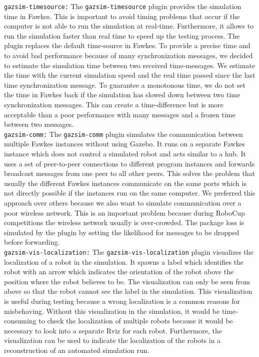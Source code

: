 \texttt{gazsim-timesource:}
The \texttt{gazsim-timesource} plugin provides the simulation time in Fawkes. This is important to avoid timing problems that occur if the computer is not able to run the simulation at real-time. Furthermore, it allows to run the simulation faster than real time to speed up the testing process. The plugin replaces the default time-source in Fawkes. To provide a precise time and to avoid bad performance because of many synchronization messages, we decided to estimate the simulation time between two received time-messages. We estimate the time with the current simulation speed and the real time passed since the last time synchronization message. To guarantee a monotonous time, we do not set the time in Fawkes back if the simulation has slowed down between two time synchronization messages. This can create a time-difference but is more acceptable than a poor performance with many messages and a frozen time between two messages.
\\

\texttt{gazsim-comm:}
The \texttt{gazsim-comm} plugin simulates the communication between multiple Fawkes instances without using Gazebo. It runs on a separate Fawkes instance which does not control a simulated robot and acts similar to a hub. It uses a set of peer-to-peer connections to different program instances and forwards broadcast messages from one peer to all other peers. This solves the problem that usually the different Fawkes instances communicate on the same ports which is not directly possible if the instances run on the same computer. We preferred this approach over others because we also want to simulate communication over a poor wireless network. This is an important problem because during RoboCup competitions the wireless network usually is over-crowded. The package loss is simulated by the plugin by setting the likelihood for messages to be dropped before forwarding.
\\

\texttt{gazsim-vis-localization:}
The \texttt{gazsim-vis-localization} plugin visualizes the localization of a robot in the simulation. It spawns a label which identifies the robot with an arrow which indicates the orientation of the robot above the position where the robot believes to be. The visualization can only be seen from above so that the robot cannot see the label in the simulation. This visualization is useful during testing because a wrong localization is a common reasons for misbehaving. Without this visualization in the simulation, it would be time-consuming to check the localization of multiple robots because it would be necessary to look into a separate Rviz for each robot. Furthermore, the visualization can be used to indicate the localization of the robots in a reconstruction of an automated simulation run.
\\


